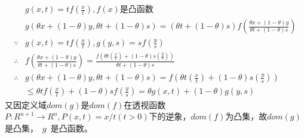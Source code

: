 \documentclass[12pt,a4paper,fontset=none]{ctexart}
\begin{document}
\begin{align*}
	           & g(x,t)=tf(\frac{x}{t} ),f(x)\text{是凸函数}                                                                                            \\
	           & g(\theta x+(1-\theta)y,\theta t+(1-\theta)s)=(\theta t+(1-\theta)s)f(\frac{\theta x+(1-\theta)y}{\theta t+(1-\theta)s} )               \\
	\because   & g(x,t)=tf(\frac{x}{t} ),g(y,s)=sf(\frac{y}{s} )                                                                                        \\
	\therefore & f(\frac{\theta x+(1-\theta)y}{\theta t+(1-\theta)s} )=\frac{f(\theta t(\frac{x}{t} )+(1-\theta)s(\frac{y}{s} ))}{\theta t+(1-\theta)s} \\
	\therefore & g(\theta x+(1-\theta)y,\theta t+(1-\theta)s)= f(\theta t(\frac{x}{t} )+(1-\theta)s(\frac{y}{s} ))                                      \\
	           & \leq \theta tf(\frac{x}{t} )+(1-\theta)sf(\frac{y}{s} )=\theta g(x,t)+(1-\theta)g(y,s)
\end{align*}
又因定义域$dom(g)$是$dom(f)$在透视函数$P:R^{n+1}\to R^n,P(x,t)=x/t(t>0)$下的逆象，$dom(f)$为凸集，故$dom(g)$是凸集，~$g$~是凸函数。
\end{document}
